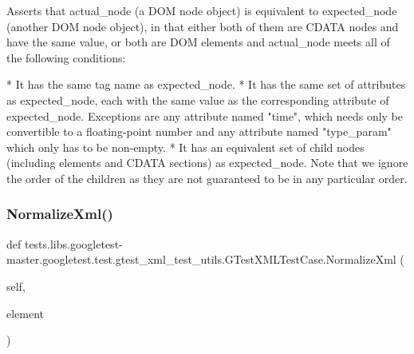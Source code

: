 \begin{DoxyVerb}Asserts that actual_node (a DOM node object) is equivalent to
expected_node (another DOM node object), in that either both of
them are CDATA nodes and have the same value, or both are DOM
elements and actual_node meets all of the following conditions:

*  It has the same tag name as expected_node.
*  It has the same set of attributes as expected_node, each with
   the same value as the corresponding attribute of expected_node.
   Exceptions are any attribute named "time", which needs only be
   convertible to a floating-point number and any attribute named
   "type_param" which only has to be non-empty.
*  It has an equivalent set of child nodes (including elements and
   CDATA sections) as expected_node.  Note that we ignore the
   order of the children as they are not guaranteed to be in any
   particular order.
\end{DoxyVerb}
 \mbox{\label{classtests_1_1libs_1_1googletest-master_1_1googletest_1_1test_1_1gtest__xml__test__utils_1_1GTestXMLTestCase_afed0cd3ae51ca27ffcd8af84b161706a}} 
\subsubsection{\texorpdfstring{Normalize\+Xml()}{NormalizeXml()}}
{\footnotesize\ttfamily def tests.\+libs.\+googletest-\/master.\+googletest.\+test.\+gtest\+\_\+xml\+\_\+test\+\_\+utils.\+G\+Test\+X\+M\+L\+Test\+Case.\+Normalize\+Xml (\begin{DoxyParamCaption}\item[{}]{self,  }\item[{}]{element }\end{DoxyParamCaption})}

